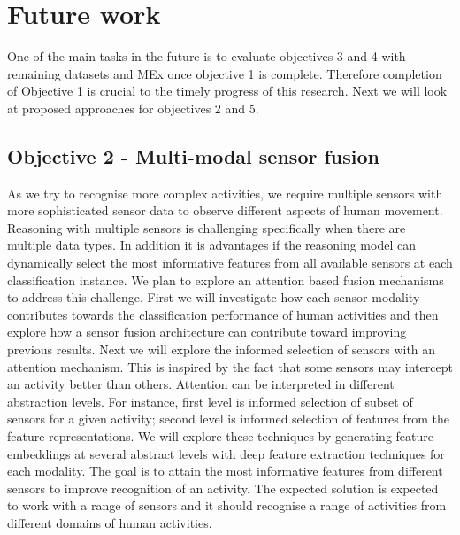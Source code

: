 \documentclass[runningheads]{llncs}
\begin{document}
\section{Future work}
\label{sec:fut}

One of the main tasks in the future is to evaluate objectives 3 and 4 with remaining datasets and MEx once objective 1 is complete. Therefore completion of Objective 1 is crucial to the timely progress of this research. 
Next we will look at proposed approaches for objectives 2 and 5.

\subsection{Objective 2 - Multi-modal sensor fusion}
As we try to recognise more complex activities, we require multiple sensors with more sophisticated sensor data to observe different aspects of human movement. Reasoning with multiple sensors is challenging specifically when there are multiple data types. In addition it is advantages if the reasoning model can dynamically select the most informative features from all available sensors at each classification instance.
We plan to explore an attention based fusion mechanisms to address this challenge. 
First we will investigate how each sensor modality contributes towards the classification performance of human activities and then explore how a sensor fusion architecture can contribute toward improving previous results. Next we will explore the informed selection of sensors with an attention mechanism. This is inspired by the fact that some sensors may intercept an activity better than others. Attention can be interpreted in different abstraction levels. For instance, first level is informed selection of subset of sensors for a given activity; second level is informed selection of features from the feature representations. We will explore these techniques by generating feature embeddings at several abstract levels with deep feature extraction techniques for each modality. The goal is to attain the most informative features from different sensors to improve recognition of an activity. The expected solution is expected to work with a range of sensors and it should recognise a range of activities from different domains of human activities. 
\end{document}
